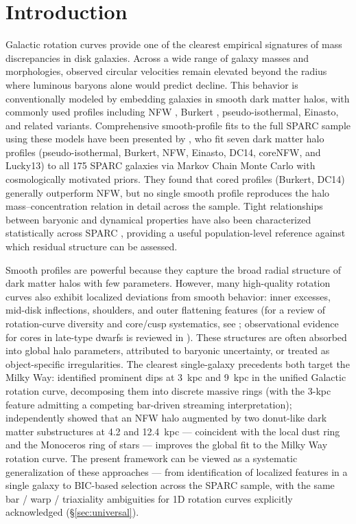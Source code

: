 \documentclass[linenumbers]{aastex701}
\begin{document}


\section{Introduction}\label{sec:intro}

Galactic rotation curves provide one of the clearest empirical signatures of mass discrepancies in disk galaxies. Across a wide range of galaxy masses and morphologies, observed circular velocities remain elevated beyond the radius where luminous baryons alone would predict decline. This behavior is conventionally modeled by embedding galaxies in smooth dark matter halos, with commonly used profiles including NFW \citep{NFW1996,NFW1997}, Burkert \citep{Burkert1995}, pseudo-isothermal, Einasto, and related variants. Comprehensive smooth-profile fits to the full SPARC sample using these models have been presented by \citet{Li2020}, who fit seven dark matter halo profiles (pseudo-isothermal, Burkert, NFW, Einasto, DC14, coreNFW, and Lucky13) to all 175 SPARC galaxies via Markov Chain Monte Carlo with cosmologically motivated priors. They found that cored profiles (Burkert, DC14) generally outperform NFW, but no single smooth profile reproduces the halo mass--concentration relation in detail across the sample. Tight relationships between baryonic and dynamical properties have also been characterized statistically across SPARC \citep{Lelli2016,McGaugh2016}, providing a useful population-level reference against which residual structure can be assessed.

Smooth profiles are powerful because they capture the broad radial structure of dark matter halos with few parameters. However, many high-quality rotation curves also exhibit localized deviations from smooth behavior: inner excesses, mid-disk inflections, shoulders, and outer flattening features (for a review of rotation-curve diversity and core/cusp systematics, see \citealt{deBlok2010}; observational evidence for cores in late-type dwarfs is reviewed in \citealt{Oh2015}). These structures are often absorbed into global halo parameters, attributed to baryonic uncertainty, or treated as object-specific irregularities. The clearest single-galaxy precedents both target the Milky Way: \citet{Sofue2009} identified prominent dips at 3~kpc and 9~kpc in the unified Galactic rotation curve, decomposing them into discrete massive rings (with the 3-kpc feature admitting a competing bar-driven streaming interpretation); \citet{deBoerWeber2011} independently showed that an NFW halo augmented by two donut-like dark matter substructures at 4.2 and 12.4~kpc --- coincident with the local dust ring and the Monoceros ring of stars --- improves the global fit to the Milky Way rotation curve. The present framework can be viewed as a systematic generalization of these approaches --- from identification of localized features in a single galaxy to BIC-based selection across the SPARC sample, with the same bar / warp / triaxiality ambiguities for 1D rotation curves explicitly acknowledged (\S\ref{sec:universal}).
\end{document}
